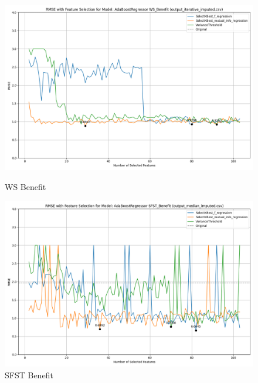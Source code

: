 \begin{figure}[H]
    \centering
    \begin{minipage}{0.45\textwidth}
        \centering
        \includegraphics[width=\linewidth]{reg_section_all/images_reg_featred_graphs/feature_selection_WS_Benefit.png}
        \caption{WS Benefit}
        \label{fig:ws_ben_reg_featred}
    \end{minipage}\hfill
    \begin{minipage}{0.45\textwidth}
        \centering
        \includegraphics[width=\linewidth]{reg_section_all/images_reg_featred_graphs/feature_selection_SFST_Benefit.png}
        \caption{SFST Benefit}
        \label{fig:sfst_ben_reg_featred}
    \end{minipage}
\end{figure}